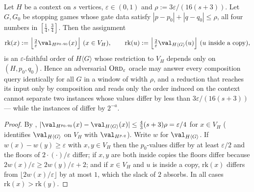 \begin{corollary}\label{cor:wo-context-blind}
Let $H$ be a context on $s$ vertices, $\varepsilon\in(0,1)$ and
$\rho:=3\varepsilon/(16(s+3))$. Let $G,G_0$ be stopping games whose gate data
satisfy $|p-p_0|+|q-q_0|\le\rho$, all four numbers in $[\tfrac14,\tfrac34]$.
Then the assignment
\[
  \mathrm{rk}(x):=\Bigl\lfloor\tfrac{2}{\varepsilon}\val_{H^{p_0,q_0}}(x)\Bigr\rfloor\ (x\in V_H),
  \qquad
  \mathrm{rk}(u):=\Bigl\lfloor\tfrac{2}{\varepsilon}\val_{H\langle G\rangle}(u)\Bigr\rfloor\ (u\ \text{inside a copy}),
\]
is an $\varepsilon$-faithful order of $H\langle G\rangle$ whose restriction to
$V_H$ depends only on $(H,p_0,q_0)$. Hence an adversarial
$\textsc{Ord}_\varepsilon$ oracle may answer every composition query
identically for all $G$ in a window of width $\rho$, and a reduction that
reaches its input only by composition and reads only the order induced on the
context cannot separate two instances whose values differ by less than
$3\varepsilon/(16(s+3))$ --- while the instances of  differ by
$2^{-a}$.
\end{corollary}

\begin{proof}
By , $|\val_{H^{p_0,q_0}}(x)-\val_{H\langle
G\rangle}(x)|\le\tfrac43(s+3)\rho=\varepsilon/4$ for $x\in V_H$
( identifies $\val_{H\langle G\rangle}$ on $V_H$ with
$\val_{H^{p,q}}$). Write $w$ for $\val_{H\langle G\rangle}$. If
$w(x)-w(y)\ge\varepsilon$ with $x,y\in V_H$ then the $p_0$-values differ by at
least $\varepsilon/2$ and the floors of $2\cdot(\cdot)/\varepsilon$ differ; if
$x,y$ are both inside copies the floors differ because
$2w(x)/\varepsilon\ge2w(y)/\varepsilon+2$; and if $x\in V_H$ and $u$ is inside
a copy, $\mathrm{rk}(x)$ differs from $\lfloor2w(x)/\varepsilon\rfloor$ by at
most $1$, which the slack of $2$ absorbs. In all cases
$\mathrm{rk}(x)>\mathrm{rk}(y)$.
\end{proof}

